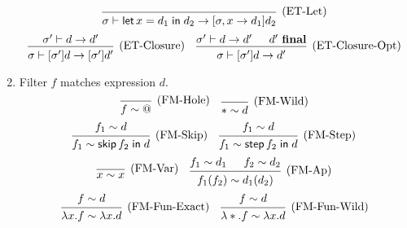 \documentclass{article}
\newcommand{\matches}{\mathrel{\mathop{\sim}}}
\newcommand{\entails}{\mathrel{\mathop{\vdash}}}
\newcommand{\final}{~\mathbf{final}}
\DeclareMathOperator{\fskip}{\mathsf{skip}}
\DeclareMathOperator{\fstep}{\mathsf{step}}
\newcommand{\fin}{\mathrel{\mathop{\mathsf{in}}}}
\newcommand{\flet}{\operatorname{\mathsf{let}}}
\begin{document}
\begin{enumerate}
\[    \]
    \[
      \begin{prooftree}
        \infer0[(ET-Let)]{
          \sigma \entails
          \flet x = d_1 \fin d_2
          \to
          [\sigma, x \to d_1] d_2
        }
      \end{prooftree}
    \]
    \[
      \begin{prooftree}
        \hypo{\sigma' \entails d \to d'}
        \infer1[(ET-Closure)]{\sigma \entails [\sigma'] d \to [\sigma'] d'}
      \end{prooftree}
      \quad
      \begin{prooftree}
        \hypo{\sigma' \entails d \to d'}
        \hypo{d' \final}
        \infer2[(ET-Closure-Opt)]{\sigma \entails [\sigma'] d \to d'}
      \end{prooftree}
    \]
  \item \fbox{\(f \matches d\)} Filter \(f\) matches expression \(d\).
    \[
      \begin{prooftree}
        \infer0[(FM-Hole)]{f \matches @}
      \end{prooftree}
      \quad
      \begin{prooftree}
        \infer0[(FM-Wild)]{\ast \matches d}
      \end{prooftree}
    \]
    \[
      \begin{prooftree}
        \hypo{f_1 \matches d}
        \infer1[(FM-Skip)]{f_1 \matches \fskip f_2 \fin d}
      \end{prooftree}
      \quad
      \begin{prooftree}
        \hypo{f_1 \matches d}
        \infer1[(FM-Step)]{f_1 \matches \fstep f_2 \fin d}
      \end{prooftree}
    \]
    \[
      \begin{prooftree}
        \infer0[(FM-Var)]{x \matches x}
      \end{prooftree}
      \quad
      \begin{prooftree}
        \hypo{f_1 \matches d_1}
        \hypo{f_2 \matches d_2}
        \infer2[(FM-Ap)]{f_1(f_2) \matches d_1(d_2)}
      \end{prooftree}
    \]
    \[
      \begin{prooftree}
        \hypo{f \matches d}
        \infer1[(FM-Fun-Exact)]{\lambda x . f \matches \lambda x . d}
      \end{prooftree}
      \quad
      \begin{prooftree}
        \hypo{f \matches d}
        \infer1[(FM-Fun-Wild)]{
          \lambda \ast . f \matches \lambda x . d
}
\end{prooftree}\]
\end{enumerate}
\end{document}
